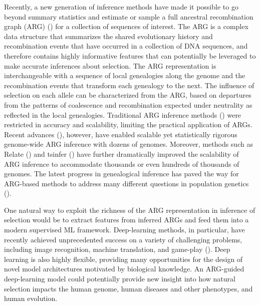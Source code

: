 Recently, a new generation of inference methods have made it possible to go beyond summary statistics and estimate or sample a full ancestral recombination graph (ARG) (\cite{hudson_gene_1990,griffiths_ancestral_1996,wiuf_recombination_1999}) for a collection of sequences of interest. The ARG is a complex data structure that summarizes the shared evolutionary history and recombination events that have occurred in a collection of DNA sequences, and therefore contains highly informative features that can potentially be leveraged to make accurate inferences about selection. The ARG representation is interchangeable with a sequence of local genealogies along the genome and the recombination events that transform each genealogy to the next. The influence of selection on each allele can be characterized from the ARG, based on departures from the patterns of coalescence and recombination expected under neutrality as reflected in the local genealogies. Traditional ARG inference methods (\cite{hein_heuristic_1993,song_constructing_2005,minichiello_mapping_2006,kuhner_lamarc_2006,ofallon_acg_2013}) were restricted in accuracy and scalability, limiting the practical application of ARGs. Recent advances (\cite{rasmussen_genome-wide_2014}), however, have enabled scalable yet statistically rigorous genome-wide ARG inference with dozens of genomes. Moreover, methods such as Relate (\cite{speidel_method_2019}) and tsinfer (\cite{kelleher_inferring_2019}) have further dramatically improved the scalability of ARG inference to accommodate thousands or even hundreds of thousands of genomes. The latest progress in genealogical inference has paved the way for ARG-based methods to address many different questions in population genetics (\cite{arenas_importance_2013,rasmussen_genome-wide_2014,kelleher_inferring_2019,speidel_method_2019}).

One natural way to exploit the richness of the ARG representation in inference of selection would be to extract features from inferred ARGs and feed them into a modern supervised ML framework. Deep-learning methods, in particular, have recently achieved unprecedented success on a variety of challenging problems, including image recognition, machine translation, and game-play (\cite{lecun_deep_2015}). Deep learning is also highly flexible, providing many opportunities for the design of novel model architectures motivated by biological knowledge. An ARG-guided deep-learning model could potentially provide new insight into how natural selection impacts the human genome, human diseases and other phenotypes, and human evolution.

